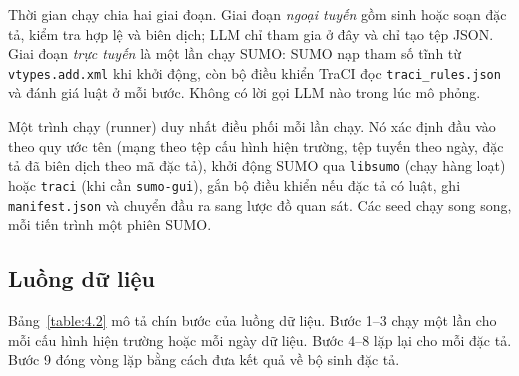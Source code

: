 \documentclass[../DoAn.tex]{subfiles}
\begin{document}
Thời gian chạy chia hai giai đoạn. Giai đoạn \emph{ngoại tuyến} gồm sinh hoặc soạn đặc tả, kiểm tra hợp lệ và biên dịch; LLM chỉ tham gia ở đây và chỉ tạo tệp JSON. Giai đoạn \emph{trực tuyến} là một lần chạy SUMO: SUMO nạp tham số tĩnh từ \texttt{vtypes.add.xml} khi khởi động, còn bộ điều khiển TraCI đọc \texttt{traci\_rules.json} và đánh giá luật ở mỗi bước. Không có lời gọi LLM nào trong lúc mô phỏng.

Một trình chạy (runner) duy nhất điều phối mỗi lần chạy. Nó xác định đầu vào theo quy ước tên (mạng theo tệp cấu hình hiện trường, tệp tuyến theo ngày, đặc tả đã biên dịch theo mã đặc tả), khởi động SUMO qua \texttt{libsumo} (chạy hàng loạt) hoặc \texttt{traci} (khi cần \texttt{sumo-gui}), gắn bộ điều khiển nếu đặc tả có luật, ghi \texttt{manifest.json} và chuyển đầu ra sang lược đồ quan sát. Các seed chạy song song, mỗi tiến trình một phiên SUMO.

\subsection{Luồng dữ liệu}

Bảng~\ref{table:4.2} mô tả chín bước của luồng dữ liệu. Bước 1--3 chạy một lần cho mỗi cấu hình hiện trường hoặc mỗi ngày dữ liệu. Bước 4--8 lặp lại cho mỗi đặc tả. Bước 9 đóng vòng lặp bằng cách đưa kết quả về bộ sinh đặc tả.
\end{document}
